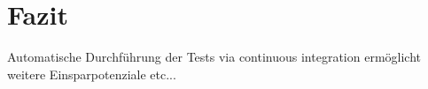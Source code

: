 \section{Fazit}
Automatische Durchführung der Tests via continuous integration ermöglicht weitere Einsparpotenziale etc...